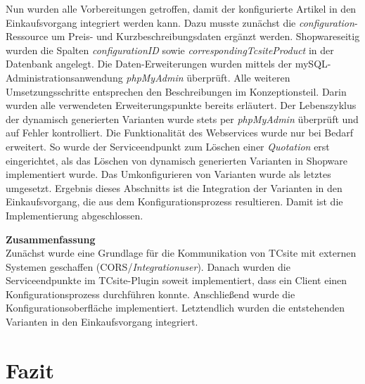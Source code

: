 \documentclass[12pt,a4paper,bibliography=totocnumbered,listof=totoc]{scrartcl}
\begin{document}
Nun wurden alle Vorbereitungen getroffen, damit der konfigurierte Artikel in den Einkaufsvorgang integriert werden kann. Dazu musste zunächst die \emph{configuration}-Ressource um Preis- und Kurzbeschreibungsdaten ergänzt werden. Shopwareseitig wurden die Spalten \emph{configurationID} sowie \emph{correspondingTcsiteProduct} in der Datenbank angelegt. Die Daten-Erweiterungen wurden mittels der mySQL-Administrationsanwendung \emph{phpMyAdmin} überprüft. Alle weiteren Umsetzungsschritte entsprechen den Beschreibungen im Konzeptionsteil. Darin wurden alle verwendeten Erweiterungspunkte bereits erläutert. Der Lebenszyklus der dynamisch generierten Varianten wurde stets per \emph{phpMyAdmin} überprüft und auf Fehler kontrolliert. Die Funktionalität des Webservices wurde nur bei Bedarf erweitert. So wurde der Serviceendpunkt zum Löschen einer \emph{Quotation} erst eingerichtet, als das Löschen von dynamisch generierten Varianten in Shopware implementiert wurde. Das Umkonfigurieren von Varianten wurde als letztes umgesetzt. Ergebnis dieses Abschnitts ist die Integration der Varianten in den Einkaufsvorgang, die aus dem Konfigurationsprozess resultieren. Damit ist die Implementierung abgeschlossen.

\textbf{Zusammenfassung}\\
Zunächst wurde eine Grundlage für die Kommunikation von TCsite mit externen Systemen geschaffen (CORS/\emph{Integrationuser}). Danach wurden die Serviceendpunkte im TCsite-Plugin soweit implementiert, dass ein Client einen Konfigurationsprozess durchführen konnte. Anschließend wurde die Konfigurationsoberfläche implementiert. Letztendlich wurden die entstehenden Varianten in den Einkaufsvorgang integriert.

\pagebreak

\section{Fazit}

\pagebreak






\end{document}

